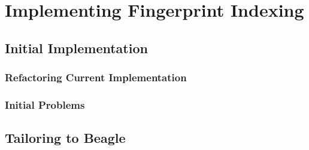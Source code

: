 
\chapter{Implementing Fingerprint Indexing}
\label{cha:method}

\section{Initial Implementation}
\label{sec:initial}

\subsection{Refactoring Current Implementation}

\subsection{Initial Problems}

\section{Tailoring to Beagle}
\label{sec:tailored}

